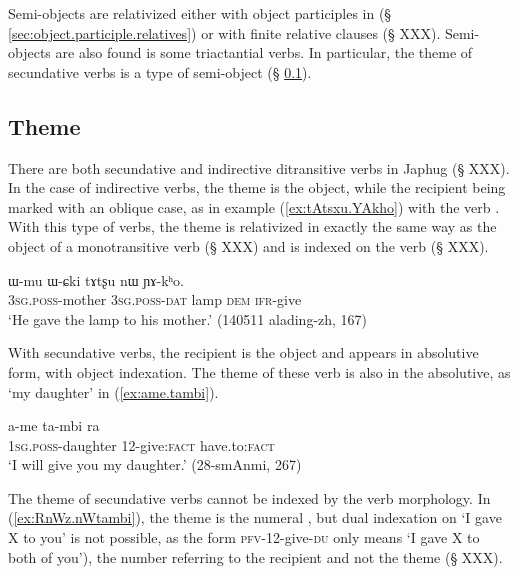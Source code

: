 Semi-objects are relativized either with object participles in  (§ \ref{sec:object.participle.relatives}) or with finite relative clauses (§ XXX). Semi-objects are also found is some triactantial verbs. In particular, the theme of secundative verbs is a type of semi-object (§ \ref{sec:theme.ditransitive}).

\subsection{Theme}  \label{sec:theme.ditransitive}
There are both secundative and indirective ditransitive verbs in Japhug (§ XXX). In the case of indirective verbs, the theme is the object, while the recipient being marked with an oblique case, as in example (\ref{ex:tAtsxu.YAkho}) with the verb  . With this type of verbs, the theme is relativized in exactly the same way as the object of a monotransitive verb (§ XXX) and is indexed on the verb (§ XXX).

\begin{exe}
\ex \label{ex:tAtsxu.YAkho} 
\gll ɯ-mu ɯ-ɕki tɤtʂu nɯ ɲɤ-kʰo. \\
\textsc{3sg}.\textsc{poss}-mother \textsc{3sg}.\textsc{poss}-\textsc{dat} lamp \textsc{dem}  \textsc{ifr}-give \\
 \glt `He gave the lamp to his mother.' (140511 alading-zh, 167)
\end{exe}

With secundative verbs, the recipient is the object and appears in absolutive form, with object indexation. The theme of these verb is also in the absolutive, as  `my daughter' in (\ref{ex:ame.tambi}).

\begin{exe}
\ex \label{ex:ame.tambi}
 \gll a-me ta-mbi ra \\
\textsc{1sg}.\textsc{poss}-daughter 1\fl{}2-give:\textsc{fact} have.to:\textsc{fact} \\
\glt  `I will give you my daughter.'  (28-smAnmi, 267)
\end{exe}

The theme of secundative verbs cannot be indexed by the verb morphology. In (\ref{ex:RnWz.nWtambi}), the theme is the numeral , but dual indexation on  `I gave X to you' is not possible, as the form  \textsc{pfv}-1\fl{}2-give-\textsc{du} only means `I gave X to both of you'), the number referring to the recipient and not the theme (§ XXX). 

